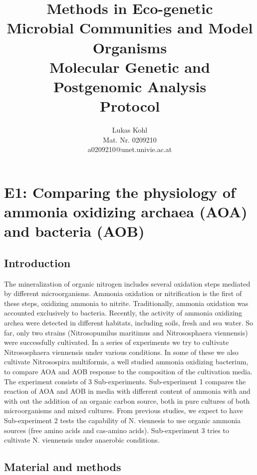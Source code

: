 \documentclass[a4paper,10pt]{article}
\title{Methods in Eco-genetic \\ Microbial Communities and Model Organisms \\ Molecular Genetic and Postgenomic Analysis \\ Protocol}
\author{Lukas Kohl \\ Mat. Nr. 0209210 \\ a0209210@unet.univie.ac.at}
\begin{document}
\maketitle

\section{E1: Comparing the physiology of ammonia oxidizing archaea (AOA) and bacteria (AOB)}

\subsection{Introduction}


The mineralization of organic nitrogen includes several oxidation steps mediated by different microorganisms. Ammonia oxidation or nitrification is the first of these steps, oxidizing ammonia to nitrite. 
Traditionally, ammonia oxidation was accounted exclusively to bacteria. Recently, the activity of ammonia oxidizing archea were detected in different habitats, including soils, fresh and sea water. So far, only two strains (Nitrosopumilus maritimus and Nitrososphaera viennensis) were successfully cultivated. 
In a series of experiments we try to cultivate Nitrososphaera viennensis under various conditions. In some of these we also cultivate Nitrosospira multiformis, a well studied ammonia oxidizing bacterium, to compare AOA and AOB response to the composition of the cultivation media.
\\The experiment consists of 3 Sub-experiments. Sub-experiment 1 compares the reaction of AOA and AOB in media with different content of ammonia with and with out the addition of an organic carbon source, both in pure cultures of both microorganisms and mixed cultures. From previous studies, we expect to have 
\\Sub-experiment 2 tests the capability of N. viennesis to use organic ammonia sources (free amino acids and cas-amino acids). Sub-experiment 3 tries to cultivate N. viennensis under anaerobic conditions.

\subsection{Material and methods}
\end{document}
